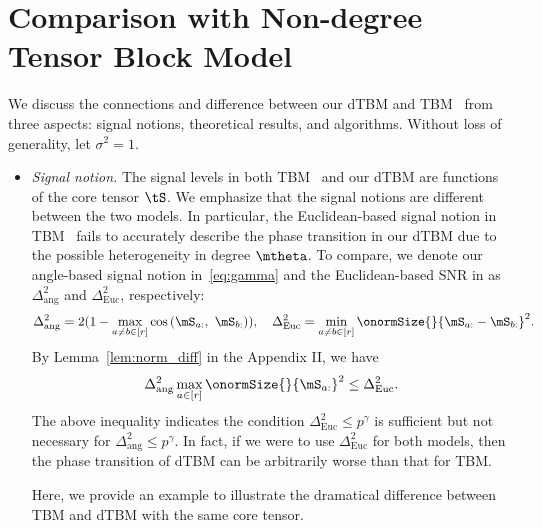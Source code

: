 \documentclass[lettersize,onecolumn,journal]{IEEEtran}
\theoremstyle{definition}
\theoremstyle{definition}
\newcommand{\of}[1]{\left(#1\right)}
\begin{document}
{
\color{blue}

\section{Comparison with Non-degree Tensor Block Model} \label{sec:tbm}
We discuss the connections and difference between our dTBM and TBM~\citep{han2020exact} from three aspects: signal notions, theoretical results, and algorithms. Without loss of generality, let $\sigma^2=1$. 

\begin{itemize}[wide]
    \item \textit{Signal notion.} The signal levels in both TBM~\citep{han2020exact} and our dTBM are functions of the core tensor $\tS$. We emphasize that the signal notions are different between the two models. In particular, the Euclidean-based signal notion in TBM~\cite{han2020exact} fails to accurately describe the phase transition in our dTBM due to the possible heterogeneity in degree $\mtheta$. To compare, we denote our angle-based signal notion in~\eqref{eq:gamma} and the Euclidean-based SNR in \cite{han2020exact} as $\Delta_{\text{ang}}^2$ and $\Delta_{\text{Euc}}^2$, respectively:
\begin{equation}
     \Delta_{\text{ang}}^2 =  2(1 - \max_{a \neq b\in [r]}\cos \of{\mS_{a:},\  \mS_{b:}} ), \quad \Delta_{\text{Euc}}^2 = \min_{a \neq b \in [r]} \onormSize{}{\mS_{a:} - \mS_{b:}}^2.
\end{equation}
By Lemma~\ref{lem:norm_diff} in the Appendix II, we have 
\begin{equation}\label{eq:signalcompare}
     \Delta_{\text{ang}}^2  \max_{a \in [r]}\onormSize{}{\mS_{a:}}^2 \leq \Delta_{\text{Euc}}^2.
\end{equation}
The above inequality indicates the condition $\Delta_{\text{Euc}}^2 \leq p^{\gamma}$ is sufficient but not necessary for $\Delta_{\text{ang}}^2 \leq p^{\gamma}$. In fact, if we were to use $\Delta_{\text{Euc}}^2$ for both models, then the phase transition of dTBM can be arbitrarily worse than that for TBM. 


Here, we provide an example to illustrate the dramatical difference between TBM and dTBM with the same core tensor.  


\end{itemize}}
\end{document}
